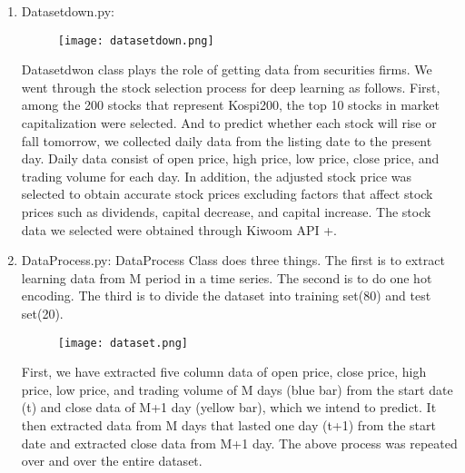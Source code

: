 \documentclass[conference]{IEEEtran}
\begin{document}
\begin{enumerate}
    \begin{enumerate}
    \item Datasetdown.py:
    
    \begin{figure}[h]
        \begin{center}
        \centering
        \texttt{[image: datasetdown.png]}
        \caption{}
        \label{fig:my_label}
        \end{center}
        \end{figure}
    Datasetdwon class plays the role of getting data from securities firms. We went through the stock selection process for deep learning as follows. First, among the 200 stocks that represent Kospi200, the top 10 stocks in market capitalization were selected. And to predict whether each stock will rise or fall tomorrow, we collected daily data from the listing date to the present day. Daily data consist of open price, high price, low price, close price, and trading volume for each day. In addition, the adjusted stock price was selected to obtain accurate stock prices excluding factors that affect stock prices such as dividends, capital decrease, and capital increase. The stock data we selected were obtained through Kiwoom API +. \vspace{1\baselineskip}
    
    \item DataProcess.py:
    DataProcess Class does three things. The first is to extract learning data from M period in a time series. The second is to do one hot encoding. The third is to divide the dataset into training set(80) and test set(20).\vspace{1\baselineskip}
    
     \begin{figure}[h]
        \begin{center}
        \centering
        \texttt{[image: dataset.png]}
        \caption{}
        \label{fig:my_label}
        \end{center}
        \end{figure}
        
    First, we have extracted five column data of open price, close price, high price, low price, and trading volume of M days (blue bar) from the start date (t) and close data of M+1 day (yellow bar), which we intend to predict. It then extracted data from M days that lasted one day (t+1) from the start date and extracted close data from M+1 day. The above process was repeated over and over the entire dataset.\vspace{1\baselineskip}
    

\end{enumerate}
\end{enumerate}
\end{document}
